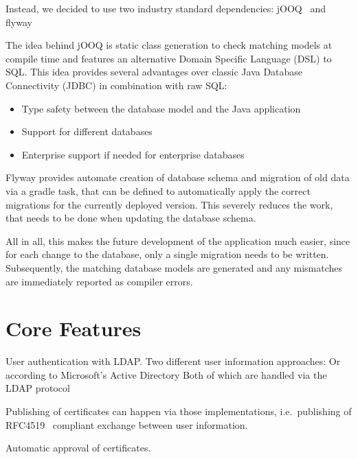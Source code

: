 Instead, we decided to use two industry standard dependencies: jOOQ~\cite{jooq} and flyway~\cite{flyway}

The idea behind jOOQ is static class generation to check matching models at compile time and features an alternative
Domain Specific Language (DSL) to SQL\@.
This idea provides several advantages over classic Java Database Connectivity (JDBC) in combination with raw SQL:
\begin{itemize}
\item Type safety between the database model and the Java application
\item Support for different databases
\item Enterprise support if needed for enterprise databases
\end{itemize}

Flyway provides automate creation of database schema and migration of old data via a gradle task, that can be defined to
automatically apply the correct migrations for the currently deployed version.
This severely reduces the work, that needs to be done when updating the database schema.

All in all, this makes the future development of the application much easier, since for each change to the database,
only a single migration needs to be written.
Subsequently, the matching database models are generated and any mismatches are immediately reported as compiler errors.

\section{Core Features}\label{sec:coreFeatures}
User authentication with LDAP. %
Two different user information approaches:
Or according to Microsoft's Active Directory
Both of which are handled via the LDAP protocol

Publishing of certificates can happen via those implementations, i.e.\ publishing of RFC4519~\cite{RFC4519} compliant
exchange between user information.

Automatic approval of certificates.
